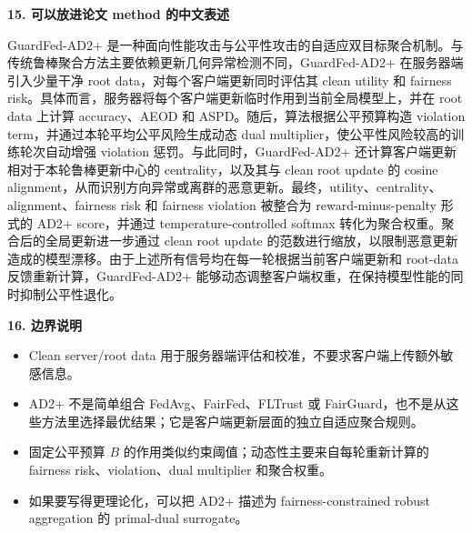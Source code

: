 \documentclass[11pt]{article}
\newcommand{\sectiontitle}[1]{%
  \vspace{0.7em}
  {\Large\bfseries\color{headblue} #1}\par
  \vspace{0.2em}
}
\begin{document}
\sectiontitle{15. 可以放进论文 method 的中文表述}

GuardFed-AD2+ 是一种面向性能攻击与公平性攻击的自适应双目标聚合机制。与传统鲁棒聚合方法主要依赖更新几何异常检测不同，GuardFed-AD2+ 在服务器端引入少量干净 root data，对每个客户端更新同时评估其 clean utility 和 fairness risk。具体而言，服务器将每个客户端更新临时作用到当前全局模型上，并在 root data 上计算 accuracy、AEOD 和 ASPD。随后，算法根据公平预算构造 violation term，并通过本轮平均公平风险生成动态 dual multiplier，使公平性风险较高的训练轮次自动增强 violation 惩罚。与此同时，GuardFed-AD2+ 还计算客户端更新相对于本轮鲁棒更新中心的 centrality，以及其与 clean root update 的 cosine alignment，从而识别方向异常或离群的恶意更新。最终，utility、centrality、alignment、fairness risk 和 fairness violation 被整合为 reward-minus-penalty 形式的 AD2+ score，并通过 temperature-controlled softmax 转化为聚合权重。聚合后的全局更新进一步通过 clean root update 的范数进行缩放，以限制恶意更新造成的模型漂移。由于上述所有信号均在每一轮根据当前客户端更新和 root-data 反馈重新计算，GuardFed-AD2+ 能够动态调整客户端权重，在保持模型性能的同时抑制公平性退化。

\sectiontitle{16. 边界说明}

\begin{itemize}
  \item Clean server/root data 用于服务器端评估和校准，不要求客户端上传额外敏感信息。
  \item AD2+ 不是简单组合 FedAvg、FairFed、FLTrust 或 FairGuard，也不是从这些方法里选择最优结果；它是客户端更新层面的独立自适应聚合规则。
  \item 固定公平预算 $B$ 的作用类似约束阈值；动态性主要来自每轮重新计算的 fairness risk、violation、dual multiplier 和聚合权重。
  \item 如果要写得更理论化，可以把 AD2+ 描述为 fairness-constrained robust aggregation 的 primal-dual surrogate。
\end{itemize}
\end{document}
